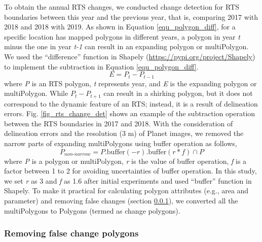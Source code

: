 \documentclass[authoryear,preprint,review,12pt]{elsarticle}
\begin{document}
To obtain the annual RTS changes, we conducted change detection for RTS boundaries between this year and the previous year, that is, comparing 2017 with 2018 and 2018 with 2019. 
 As shown in Equation \ref{equ_polygon_diff}, for a specific location has mapped polygons in different years, a polygon in year \emph{t} minus the one in year \emph{t-1} can result in an expanding polygon or multiPolygon. 
We used the ``difference'' function in Shapely (\url{https://pypi.org/project/Shapely}) to implement the subtraction in Equation \ref{equ_polygon_diff}.
\begin{equation}
E= P_{t} - P_{t-1}
\label{equ_polygon_diff}
\end{equation}
where \emph{P} is an RTS polygon, \emph{t} represents year, and \emph{E} is the expanding polygon or multiPolygon. 
While $P_{t} - P_{t+1}$ can result in a shirking polygon, but it does not correspond to the dynamic feature of an RTS; instead, it is a result of delineation errors. 
Fig. \ref{fig_rts_change_det} shows an example of the subtraction operation between the RTS boundaries in 2017 and 2018. 
With the consideration of delineation errors and the resolution (3 m) of Planet images, we removed the narrow parts of expanding multiPolygons using buffer operation as follows, 
\begin{equation}
P_{non\text{-}narrow}= P.\text{buffer}(-r).\text{buffer}(r*f) \cap P
\label{equ_polygon_buffer}
\end{equation}
where \emph{P} is a polygon or multiPolygon, \emph{r} is the value of buffer operation,  \emph{f} is a factor between 1 to 2 for avoiding uncertainties of buffer operation. 
In this study, we set \emph{r} as 3 and \emph{f} as 1.6 after initial experiments and used ``buffer'' function in Shapely.
To make it practical for calculating polygon attributes (e.g., area and parameter) and removing false changes (section \ref{sec_removing_false_change}), we converted all the multiPolygons to Polygons (termed as change polygons).




\subsubsection{Removing false change polygons}
\label{sec_removing_false_change}
\end{document}
